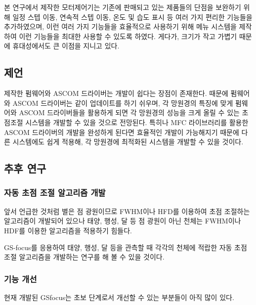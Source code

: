 본 연구에서 제작한 모터제어기는 기존에 판매되고 있는 제품들의 단점을 보완하기 위해 일정 스텝 이동, 연속적 스텝 이동, 온도 및 습도 표시 등 여러 가지 편리한 기능들을 추가하였으며, 이런 여러 가지 기능들을 효율적으로 사용하기 위해 메뉴 시스템을 제작하여 이런 기능들을 최대한 사용할 수 있도록 하였다. 게다가, 크기가 작고 가볍기 때문에 휴대성에서도 큰 이점을 지니고 있다.

\subsection{제언}

제작한 펌웨어와 ASCOM 드라이버는 개발이 쉽다는 장점이 존재한다. 때문에 펌웨어와 ASCOM 드라이버는 같이 업데이트를 하기 쉬우며, 각 망원경의 특징에 맞게 펌웨어와 ASCOM 드라이버들을 활용하게 되면 각 망원경의 성능을 크게 올릴 수 있는 초점조절 시스템을 개발할 수 있을 것으로 전망된다.
특히나 MFC 라이브러리를 활용한 ASCOM 드라이버의 개발을 완성하게 된다면 효율적인 개발이 가능해지기 때문에 다른 시스템에도 쉽게 적용해, 각 망원경에 최적화된 시스템을 개발할 수 있을 것이다.


\subsection{추후 연구}


\subsubsection{자동 초점 조절 알고리즘 개발}

앞서 언급한 것처럼 별은 점 광원이므로 FWHM이나 HFD를 이용하여 초점 조절하는 알고리즘이 개발되어 있으나 태양, 행성, 달 등 점 광원이 아닌 천체는 FWHM이나 HDF를 이용한 알고리즘을 적용하기 힘들다. 

GS-focus를 응용하여 태양, 행성, 달 등을 관측할 때 각각의 천체에 적랍한 자동 초점 조절 알고리즘을 개발하는 연구를 해 볼 수 있을 것이다. 


\subsubsection{기능 개선}

현재 개발된 GSfocus는 초보 단계로서 개선할 수 있는 부분들이 아직 많이 있다. 

